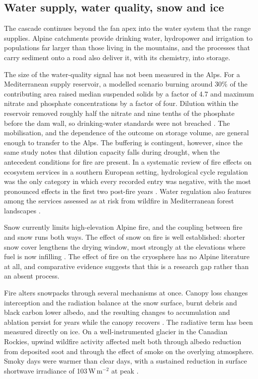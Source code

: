 \documentclass[11pt,a4paper]{article}
\begin{document}
\subsection{Water supply, water quality, snow and ice}

The cascade continues beyond the fan apex into the water system that the range supplies. Alpine catchments provide drinking water, hydropower and irrigation to populations far larger than those living in the mountains, and the processes that carry sediment onto a road also deliver it, with its chemistry, into storage.

The size of the water-quality signal has not been measured in the Alps. For a Mediterranean supply reservoir, a modelled scenario burning around 30\% of the contributing area raised median suspended solids by a factor of 4.7 and maximum nitrate and phosphate concentrations by a factor of four. Dilution within the reservoir removed roughly half the nitrate and nine tenths of the phosphate before the dam wall, so drinking-water standards were not breached \citep{basso_potential_2021}. The mobilisation, and the dependence of the outcome on storage volume, are general enough to transfer to the Alps. The buffering is contingent, however, since the same study notes that dilution capacity falls during drought, when the antecedent conditions for fire are present. In a systematic review of fire effects on ecosystem services in a southern European setting, hydrological cycle regulation was the only category in which every recorded entry was negative, with the most pronounced effects in the first two post-fire years \citep{misseyanni_impact_2025}. Water regulation also features among the services assessed as at risk from wildfire in Mediterranean forest landscapes \citep{lecinadiaz_assessing_2021}.

Snow currently limits high-elevation Alpine fire, and the coupling between fire and snow runs both ways. The effect of snow on fire is well established: shorter snow cover lengthens the drying window, most strongly at the elevations where fuel is now infilling \citep{rangwala_climate_2012, frei_evidence_2023, pede_mountain_2022}. The effect of fire on the cryosphere has no Alpine literature at all, and comparative evidence suggests that this is a research gap rather than an absent process.

Fire alters snowpacks through several mechanisms at once. Canopy loss changes interception and the radiation balance at the snow surface, burnt debris and black carbon lower albedo, and the resulting changes to accumulation and ablation persist for years while the canopy recovers \citep{koshkin_wildfire_2022}. The radiative term has been measured directly on ice. On a well-instrumented glacier in the Canadian Rockies, upwind wildfire activity affected melt both through albedo reduction from deposited soot and through the effect of smoke on the overlying atmosphere. Smoky days were warmer than clear days, with a sustained reduction in surface shortwave irradiance of 103\,W\,m$^{-2}$ at peak \citep{aubrywake_fire_2022}.
\end{document}
